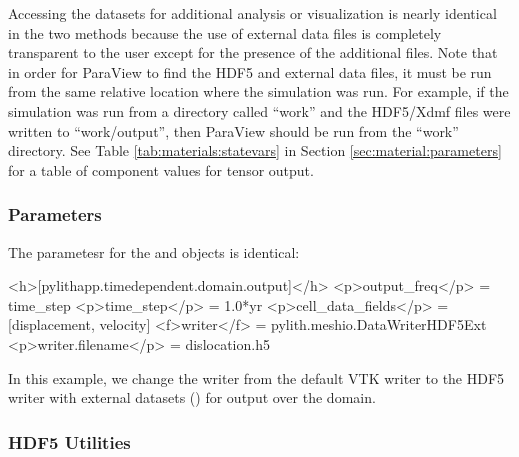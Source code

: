 
Accessing the datasets for additional analysis or visualization is
nearly identical in the two methods because the use of external data
files is completely transparent to the user except for the presence
of the additional files. Note that in order for ParaView to find the
HDF5 and external data files, it must be run from the same relative
location where the simulation was run. For example, if the simulation
was run from a directory called ``work'' and the HDF5/Xdmf files
were written to ``work/output'', then ParaView should be run from
the ``work'' directory. See Table \vref{tab:materials:statevars}
in Section \vref{sec:material:parameters} for a table of component
values for tensor output.

\subsubsection{Parameters}

The parametesr for the  and
 objects is identical:
\begin{inventory}
\end{inventory}

\begin{cfg}
<h>[pylithapp.timedependent.domain.output]</h>
<p>output_freq</p> = time_step
<p>time_step</p> = 1.0*yr
<p>cell_data_fields</p> = [displacement, velocity]
<f>writer</f> = pylith.meshio.DataWriterHDF5Ext
<p>writer.filename</p> = dislocation.h5
\end{cfg}
In this example, we change the writer from the default VTK writer to
the HDF5 writer with external datasets ()
for output over the domain.


\subsubsection{HDF5 Utilities}

